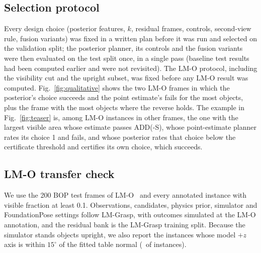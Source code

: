 \subsection{Selection protocol}
Every design choice (posterior features, $k$, residual frames, controls, second-view rule, fusion variants) was fixed in a written plan before it was run and selected on the validation split; the posterior planner, its controls and the fusion variants were then evaluated on the test split once, in a single pass (baseline test results had been computed earlier and were not revisited). The LM-O protocol, including the visibility cut and the upright subset, was fixed before any LM-O result was computed. Fig.~\ref{fig:qualitative} shows the two LM-O frames in which the posterior's choice succeeds and the point estimate's fails for the most objects, plus the frame with the most objects where the reverse holds. The example in Fig.~\ref{fig:teaser} is, among LM-O instances in other frames, the one with the largest visible area whose estimate passes ADD(-S), whose point-estimate planner rates its choice 1 and fails, and whose posterior rates that choice below the certificate threshold and certifies its own choice, which succeeds.

\subsection{LM-O transfer check}
We use the 200 BOP test frames of LM-O~\cite{brachmann2014lmo} and every annotated instance with visible fraction at least 0.1. Observations, candidates, physics prior, simulator and FoundationPose settings follow LM-Grasp, with outcomes simulated at the LM-O annotation, and the residual bank is the LM-Grasp training split. Because the simulator stands objects upright, we also report the instances whose model $+z$ axis is within $15^\circ$ of the fitted table normal (\LmoUpright\ of instances).

